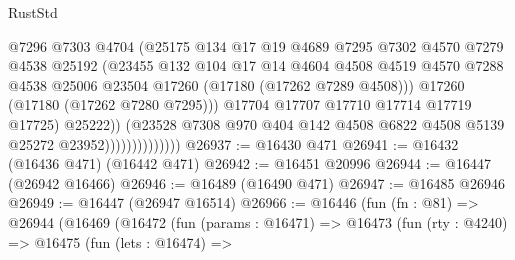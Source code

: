 \begin{lexlean}{RustStd}
\begin{coremodule}
{\begin{coremodule}
{{{{{{{{{{{{{{{{{{{{{{{{{{{{{{{{{{{{{{{{{{{{{{{{{{{{{{{                                    @7296
                                    @7303
                                    @4704
                                    (@25175
                                      @134
                                      @17
                                      @19
                                      @4689
                                      @7295
                                      @7302
                                      @4570
                                      @7279
                                      @4538
                                      @25192
                                      (@23455
                                        @132
                                        @104
                                        @17
                                        @14
                                        @4604
                                        @4508
                                        @4519
                                        @4570
                                        @7288
                                        @4538
                                        @25006
                                        @23504
                                        @17260
                                        (@17180 (@17262 @7289 @4508)))
                                      @17260
                                      (@17180 (@17262 @7280 @7295)))
                                    @17704
                                    @17707
                                    @17710
                                    @17714
                                    @17719
                                    @17725)
                                  @25222))
                              (@23528
                                @7308
                                @970
                                @404
                                @142
                                @4508
                                @6822
                                @4508
                                @5139
                                @25272
                                @23952))))))))))))))
@26937 := @16430 @471
@26941 := @16432 (@16436 @471) (@16442 @471)
@26942 := @16451 @20996
@26944 := @16447 (@26942 @16466)
@26946 := @16489 (@16490 @471)
@26947 := @16485 @26946
@26949 := @16447 (@26947 @16514)
@26966 := @16446
    (fun (fn : @81) =>
    @26944
      (@16469
        (@16472
          (fun (params : @16471) =>
          @16473
            (fun (rty : @4240) =>
            @16475
              (fun (lets : @16474) =>
}}}}}}}}}}}}}}}}}}}}}}}}}}}}}}}}}}}}}}}}}}}}}}}}}}}}}}}
\end{coremodule}}
\end{coremodule}
\end{lexlean}
